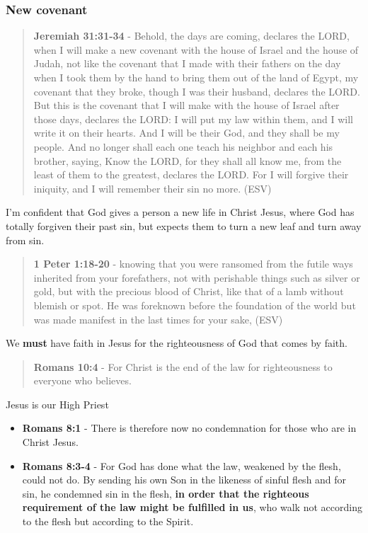 \documentclass[11pt]{article}
\begin{document}
\subsubsection{New covenant}
\label{sec:org1743226}
\begin{quote}
\textbf{Jeremiah 31:31-34} - Behold, the days are coming, declares the LORD, when I will make a new covenant with the house of Israel and the house of Judah, not like the covenant that I made with their fathers on the day when I took them by the hand to bring them out of the land of Egypt, my covenant that they broke, though I was their husband, declares the LORD. But this is the covenant that I will make with the house of Israel after those days, declares the LORD: I will put my law within them, and I will write it on their hearts. And I will be their God, and they shall be my people. And no longer shall each one teach his neighbor and each his brother, saying, Know the LORD, for they shall all know me, from the least of them to the greatest, declares the LORD. For I will forgive their iniquity, and I will remember their sin no more. (ESV)
\end{quote}

I'm confident that God gives a person a new life in Christ Jesus, where God has totally forgiven their past sin,
but expects them to turn a new leaf and turn away from sin.

\begin{quote}
\textbf{1 Peter 1:18-20} - knowing that you were ransomed from the futile ways inherited from your forefathers, not with perishable things such as silver or gold, but with the precious blood of Christ, like that of a lamb without blemish or spot. He was foreknown before the foundation of the world but was made manifest in the last times for your sake, (ESV)
\end{quote}

We \textbf{must} have faith in Jesus for the righteousness of God that comes by faith.

\begin{quote}
\textbf{Romans 10:4} - For Christ is the end of the law for righteousness to everyone who believes.
\end{quote}

Jesus is our High Priest
\begin{itemize}
\item \textbf{Romans 8:1} - There is therefore now no condemnation for those who are in Christ Jesus.
\item \textbf{Romans 8:3-4} - For God has done what the law, weakened by the flesh, could not do. By sending his own Son in the likeness of sinful flesh and for sin, he condemned sin in the flesh, \textbf{in order that the righteous requirement of the law might be fulfilled in us}, who walk not according to the flesh but according to the Spirit.
\end{itemize}
\end{document}
